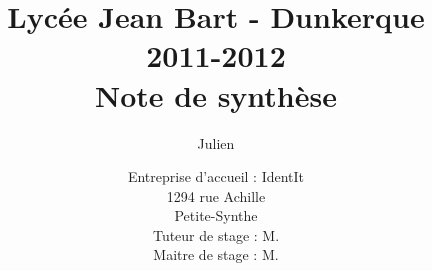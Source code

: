 \documentclass[12pt,a4paper,draft]{report}
\title
{
	\normalsize{Lycée Jean Bart - Dunkerque\\
	2011-2012}\\
	\vspace{15mm}
	\Huge{Note de synthèse}
}
\author{\bsc{Stechele} Julien\\
	\vspace{45mm}
}
\date{
	\normalsize{Entreprise d'accueil : IdentIt\\
    1294 rue Achille \bsc{Pérès}\\
	Petite-Synthe\\
	\vspace{5mm}
    Tuteur de stage : M.\bsc{Anselin}\\
	Maitre de stage : M.\bsc{Dubourg}
	}
}
\begin{document}
\maketitle

\begin{onehalfspace}



\renewcommand{\contentsname}{Sommaire}

\tableofcontents









\end{onehalfspace}
\end{document}
